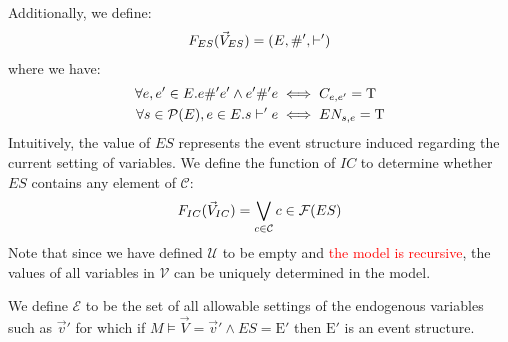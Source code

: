 Additionally, we define:
\begin{align*}
    F_{ES}(\vec V_{ES}) = (E,\#',\vdash')
\end{align*}
where we have:
\begin{align*}
    \forall e,e' \in E. e \#' e' \wedge e' \#' e
     & \iff C_{e,e'} = \mathrm{T} \\
    \forall s \in \mathcal{P}(E), e \in E.  s \vdash' e
     & \iff EN_{s,e} = \mathrm{T}
\end{align*}
Intuitively, the value of $ES$ represents the event structure induced
regarding the current setting of variables.
We define the function of $IC$ to determine whether $ES$
contains any element of $\mathcal{C}$:
\begin{align*}
    F_{IC}(\vec V_{IC}) = \bigvee_{c \in \mathcal{C}}c \in \mathcal{F}(ES)
\end{align*}
Note that since we have defined $\mathcal{U}$ to be empty and
\textcolor{red}{the model is recursive}, the values of all variables in
$\mathcal{V}$ can be uniquely determined in the model.

We define $\mathcal{E}$ to be the set of all allowable
settings of the endogenous variables such as $\vec v'$
for which if $M \vDash \vec V = \vec v' \wedge ES = \mathrm{E}'$
then $\mathrm{E}'$ is an event structure.

